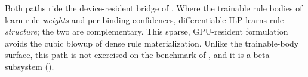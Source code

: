 Both paths ride the device-resident bridge of . Where the trainable rule bodies of  learn rule \emph{weights} and per-binding confidences, differentiable ILP learns rule \emph{structure}; the two are complementary. This sparse, GPU-resident formulation avoids the cubic blowup of dense rule materialization. Unlike the trainable-body surface, this path is not exercised on the benchmark of , and it is a beta subsystem ().
